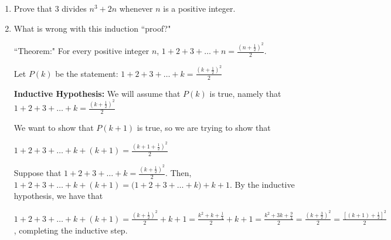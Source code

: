 \documentclass[fleqn]{article}
\theoremstyle{definition}
\begin{document}
\begin{enumerate}

\item Prove that $3$ divides $n^3+2n$ whenever $n$ is a positive integer.

\newpage


\hspace{1cm}
\vspace{8cm}

\item What is wrong with this induction ``proof?" 

\vspace{.5cm}
\hspace{2cm} ``Theorem:" \hspace{.25cm} For every positive integer $n$, $\displaystyle{1+2+3+ \ldots + n = \frac{(n+\frac{1}{2})^2}{2} }$. 

\vspace{.5cm}
Let $P(k)$ be the statement: $\displaystyle{1+2+3+ \ldots + k = \frac{(k+\frac{1}{2})^2}{2} }$

\vspace{.25cm}
\textbf{Inductive Hypothesis:} We will assume that $P(k)$ is true, namely that $\displaystyle{1+2+3+ \ldots + k = \frac{(k+\frac{1}{2})^2}{2} }$

\vspace{.5cm}
We want to show that $P(k+1)$ is true, so we are trying to show that 

\vspace{.25cm}
    \hspace{1cm} $\displaystyle{1+2+3+ \ldots + k + (k+1) = \frac{(k+1+\frac{1}{2})^2}{2} }$

\vspace{.5cm}

Suppose that $\displaystyle{1+2+3+ \ldots + k = \frac{(k+\frac{1}{2})^2}{2} }$. Then, $\displaystyle{1+2+3+ \ldots + k + (k+1) =  \Big(1+2+3+ \ldots + k\Big) + k+1 }$. By the inductive hypothesis, we have that 

\vspace{.25cm}
$\displaystyle{1+2+3+ \ldots + k + (k+1) = \frac{(k+\frac{1}{2})^2}{2} + k + 1 = \frac{k^2+k+\frac{1}{4}}{2} + k + 1 = \frac{k^2+3k+\frac{9}{4}}{2} = \frac{(k+\frac{3}{2})^2}{2} = \frac{[(k+1) + \frac{1}{2}]^2}{2} }$, completing the inductive step. 


\newpage 


\end{enumerate}
\end{document}
